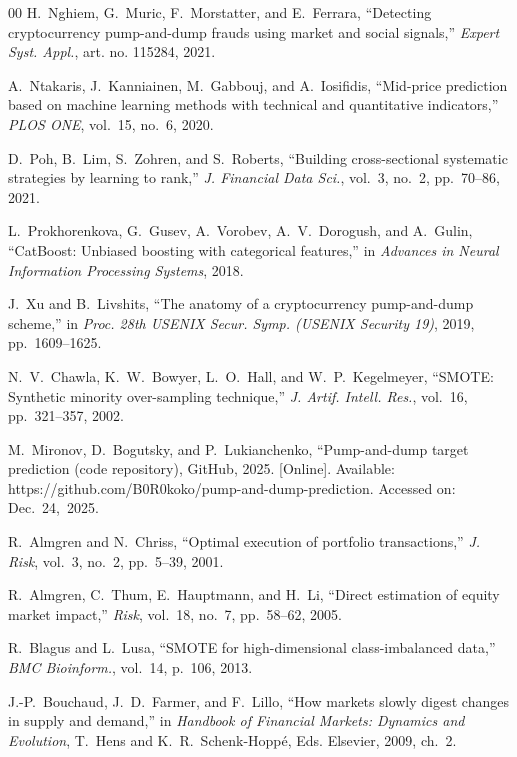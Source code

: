 \documentclass{ieeeaccess}
\begin{document}
\begin{thebibliography}{00}
 H.~Nghiem, G.~Muric, F.~Morstatter, and E.~Ferrara, ``Detecting cryptocurrency pump-and-dump frauds using market and social signals,'' \emph{Expert Syst. Appl.}, art. no. 115284, 2021.

 A.~Ntakaris, J.~Kanniainen, M.~Gabbouj, and A.~Iosifidis, ``Mid-price prediction based on machine learning methods with technical and quantitative indicators,'' \emph{PLOS ONE}, vol.~15, no.~6, 2020.

 D.~Poh, B.~Lim, S.~Zohren, and S.~Roberts, ``Building cross-sectional systematic strategies by learning to rank,'' \emph{J. Financial Data Sci.}, vol.~3, no.~2, pp.~70--86, 2021.

 L.~Prokhorenkova, G.~Gusev, A.~Vorobev, A.~V.~Dorogush, and A.~Gulin, ``CatBoost: Unbiased boosting with categorical features,'' in \emph{Advances in Neural Information Processing Systems}, 2018.

 J.~Xu and B.~Livshits, ``The anatomy of a cryptocurrency pump-and-dump scheme,'' in \emph{Proc. 28th USENIX Secur. Symp. (USENIX Security 19)}, 2019, pp.~1609--1625.

 N.~V.~Chawla, K.~W.~Bowyer, L.~O.~Hall, and W.~P.~Kegelmeyer, ``SMOTE: Synthetic minority over-sampling technique,'' \emph{J. Artif. Intell. Res.}, vol.~16, pp.~321--357, 2002.

M.~Mironov, D.~Bogutsky, and P.~Lukianchenko, ``Pump-and-dump target prediction (code repository), GitHub, 2025. [Online]. Available: https://github.com/B0R0koko/pump-and-dump-prediction. Accessed on: Dec.~24,~2025.


 R.~Almgren and N.~Chriss, ``Optimal execution of portfolio transactions,'' \emph{J. Risk}, vol.~3, no.~2, pp.~5--39, 2001.

 R.~Almgren, C.~Thum, E.~Hauptmann, and H.~Li, ``Direct estimation of equity market impact,'' \emph{Risk}, vol.~18, no.~7, pp.~58--62, 2005.

 R.~Blagus and L.~Lusa, ``SMOTE for high-dimensional class-imbalanced data,'' \emph{BMC Bioinform.}, vol.~14, p.~106, 2013.

 J.-P.~Bouchaud, J.~D.~Farmer, and F.~Lillo, ``How markets slowly digest changes in supply and demand,'' in \emph{Handbook of Financial Markets: Dynamics and Evolution}, T.~Hens and K.~R.~Schenk-Hopp\'{e}, Eds.\hspace{0.25em} Elsevier, 2009, ch.~2.


\end{thebibliography}
\end{document}
